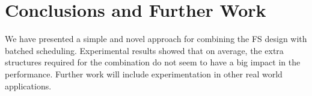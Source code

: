 \documentclass{llncs}
\begin{document}
\section{Conclusions and Further Work}
We have presented a simple and novel approach for combining the FS
design with batched scheduling. Experimental results showed that on
average, the extra structures required for the combination do not seem
to have a big impact in the performance. Further work will include
experimentation in other real world applications.







\end{document}
